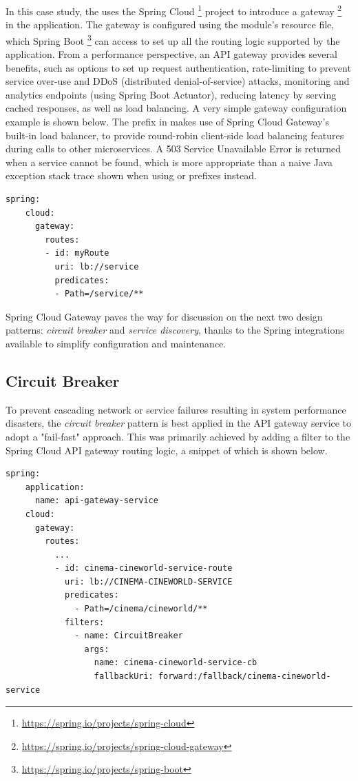 In this case study, the  uses the Spring Cloud \footnote{\url{https://spring.io/projects/spring-cloud}} project to introduce a gateway \footnote{\url{https://spring.io/projects/spring-cloud-gateway}} in the application. The gateway is configured using the module's  resource file, which Spring Boot \footnote{\url{https://spring.io/projects/spring-boot}} can access to set up all the routing logic supported by the application. From a performance perspective, an API gateway provides several benefits, such as options to set up request authentication, rate-limiting to prevent service over-use and DDoS (distributed denial-of-service) attacks, monitoring and analytics endpoints (using Spring Boot Actuator), reducing latency by serving cached responses, as well as load balancing. A very simple gateway configuration example is shown below. The  prefix in  makes use of Spring Cloud Gateway's built-in load balancer, to provide round-robin client-side load balancing features during calls to other microservices. A 503 Service Unavailable Error is returned when a service cannot be found, which is more appropriate than a naive Java exception stack trace shown when using  or  prefixes instead.

\begin{lstlisting}[caption=Sample Spring Cloud Gateway configuration.]
  spring:
    cloud:
      gateway:
        routes:
        - id: myRoute
          uri: lb://service
          predicates:
          - Path=/service/**
\end{lstlisting}

Spring Cloud Gateway paves the way for discussion on the next two design patterns: \textit{circuit breaker} and \textit{service discovery}, thanks to the Spring integrations available to simplify configuration and maintenance.

\subsection{Circuit Breaker}

To prevent cascading network or service failures resulting in system performance disasters, the \textit{circuit breaker} pattern is best applied in the API gateway service to adopt a "fail-fast" approach. This was primarily achieved by adding a  filter to the Spring Cloud API gateway routing logic, a snippet of which is shown below.

\begin{lstlisting}[caption=Snippet from the API gateway service's application properties.]
  spring:
    application:
      name: api-gateway-service
    cloud:
      gateway:
        routes:
          ...
          - id: cinema-cineworld-service-route
            uri: lb://CINEMA-CINEWORLD-SERVICE
            predicates:
              - Path=/cinema/cineworld/**
            filters:
              - name: CircuitBreaker
                args:
                  name: cinema-cineworld-service-cb
                  fallbackUri: forward:/fallback/cinema-cineworld-service
\end{lstlisting}


